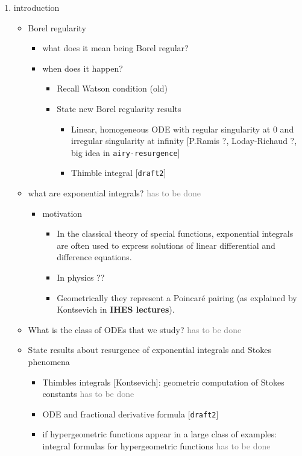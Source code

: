 \documentclass{article}
\begin{document}
\begin{enumerate}
\item introduction
\begin{itemize}
\item Borel regularity
\begin{itemize}
\item what does it mean being Borel regular?
\item when does it happen?
\begin{itemize}
\item Recall Watson condition (old)
\item State new Borel regularity results
\begin{itemize}
\item Linear, homogeneous ODE with regular singularity at 0 and irregular singularity at infinity [P.Ramis ?, Loday-Richaud ?, big idea in {\tt airy-resurgence}]
\item Thimble integral [{\tt draft2}]
\end{itemize}
\end{itemize}
\end{itemize}
\item what are exponential integrals? \textcolor{gray}{has to be done}
\begin{itemize}
\item motivation
\begin{itemize}
\item In the classical theory of special functions, exponential integrals are often used to express solutions of linear differential and difference equations.
\item In physics ??
\item Geometrically they represent a Poincar\'e pairing (as explained by Kontsevich in \textbf{IHES lectures}).
\end{itemize}
\end{itemize}
\item What is the class of ODEs that we study? \textcolor{gray}{has to be done}
\item State results about resurgence of exponential integrals and Stokes phenomena
\begin{itemize}
\item Thimbles integrals [Kontsevich]: geometric computation of Stokes constants \textcolor{gray}{has to be done}
\item ODE and fractional derivative formula [{\tt draft2}]
\item if hypergeometric functions appear in a large class of examples: integral formulas for hypergeometric functions \textcolor{gray}{has to be done}

\end{itemize}
\end{itemize}
\end{enumerate}
\end{document}
